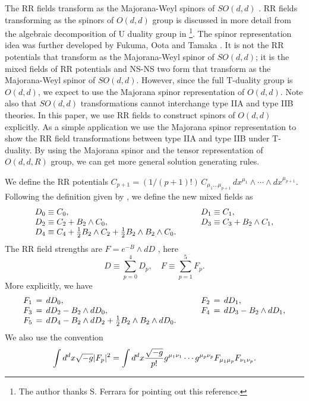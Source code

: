 \documentclass[a4paper,12pt]{article}
\begin{document}
The RR fields transform as 
the Majorana-Weyl spinors of $SO(d,d)$ \cite{brace98}.
RR fields transforming as the spinors of $O(d,d)$
group is discussed in more detail from the algebraic
decomposition of U duality group in \cite{andrianopoli96}
\footnote{The author thanks S. Ferrara for pointing out
this reference.}.
The spinor representation idea was further developed by
Fukuma, Oota and Tamaka \cite{fukuma99}. It is not
the RR potentials that transform as the 
Majorana-Weyl spinor of $SO(d,d)$; it is the mixed
fields of RR potentials and NS-NS two form that
transform as the Majorana-Weyl spinor of $SO(d,d)$.
However, since the full T-duality group is $O(d,d)$,
we expect to use the Majorana spinor representation
of $O(d,d)$. Note also that $SO(d,d)$ transformations
cannot interchange type IIA and type IIB theories.
In this paper, we use RR fields to construct spinors
of $O(d,d)$ explicitly.
As a simple application
we use the Majorana spinor representation
to show the RR field transformations between
type IIA and type IIB under T-duality. By
using the Majorana spinor and the tensor
representation of $O(d,d,R)$ group, we can get
more general solution generating rules.

We define the RR potentials $C_{p+1}=(1/(p+1)!)\,
C_{\mu_1...\mu_{p+1}}\,dx^{\mu_1}\wedge
\cdots\wedge dx^{\mu_{p+1}}$. Following the definition
given by \cite{fukuma99}, we define the new mixed
fields as
\begin{equation}
\label{newd}
\begin{array}{lcl}
D_0 \equiv C_0, & \quad & D_1 \equiv C_1, \\ 
D_2 \equiv C_2+B_2\wedge C_0, & &
                 D_3 \equiv C_3+ B_2\wedge C_1,\\
D_4 \equiv C_4+{1\over 2} B_2 \wedge C_2
             +{1\over 2} B_2 \wedge B_2 \wedge C_0.
  & & 
\end{array} 
\end{equation}
The RR field strengths are $F=e^{-B}\wedge dD$\cite{fukuma99}
\cite{green96}, here
\begin{equation}
D \equiv \sum_{p=0}^4 D_p,\quad
F \equiv \sum_{p=1}^5 F_p.
\end{equation}
More explicitly, we have
\begin{equation}
\begin{array}{lcl}
F_1\,=\,dD_0, & \quad &  F_2\,=\,dD_1, \\
F_3\,=\,dD_2- B_2\wedge dD_0, & &
                  F_4\,=\,dD_3- B_2\wedge dD_1,\\
F_5\,=\,dD_4- B_2\wedge dD_2
      +{1\over 2} B_2\wedge B_2\wedge dD_0. & & ~
\end{array} 
\end{equation}
We also use the convention
\begin{equation}
\int d^d x \sqrt{-g}|F_p|^2=
\int d^d x {\sqrt{-g}\over p!}
g^{\mu_1\nu_1}\cdots g^{\mu_p\nu_p}F_{\mu_1\mu_p}
F_{\nu_1\nu_p}.
\end{equation}
\end{document}
